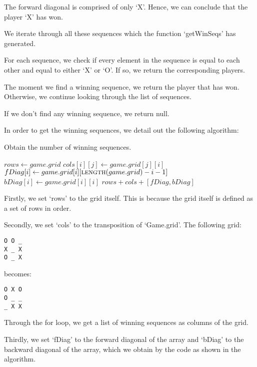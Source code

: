 \documentclass{article}
\begin{document}
The forward diagonal is comprised of only `X'. Hence, we can conclude that the player `X' has won.

We iterate through all these sequences which the function `getWinSeqs' has generated.

For each sequence, we check if every element in the sequence is equal to each other and equal to either `X' or `O'. If so, we return the corresponding players.

The moment we find a winning sequence, we return the player that has won. Otherwise, we continue looking through the list of sequences.

If we don't find any winning sequence, we return null.

In order to get the winning sequences, we detail out the following algorithm:

\begin{algorithm}
\caption{Obtain the number of winning sequences.}

\begin{algorithmic}[2]
\State $rows \gets game.grid$
    \State $cols[i][j] \gets game.grid[j][i]$
  \EndFor
\EndFor
{}
  \State $fDiag[i] \gets game.grid[i][\Call{length}{game.grid} - i - 1]$
\EndFor
{}
  \State $bDiag[i] \gets game.grid[i][i]$
\EndFor
\Return $rows + cols + [fDiag, bDiag]$
\EndProcedure
\end{algorithmic}
\end{algorithm}

Firstly, we set `rows' to the grid itself. This is because the grid itself is defined as a set of rows in order.

Secondly, we set `cols' to the transposition of `Game.grid'. The following grid:

\begin{verbatim}
O O _
X _ X
O _ X
\end{verbatim}

becomes:

\begin{verbatim}
O X O
O _ _
_ X X
\end{verbatim}

Through the for loop, we get a list of winning sequences as columns of the grid.

Thirdly, we set `fDiag' to the forward diagonal of the array and `bDiag' to the backward diagonal of the array, which we obtain by the code as shown in the algorithm.
\end{document}
